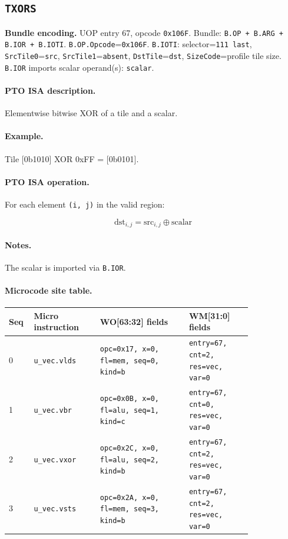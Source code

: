 \subsection{\texttt{TXORS}}
\noindent\textbf{Bundle encoding.} UOP entry 67, opcode \texttt{0x106F}. Bundle: \texttt{B.OP + B.ARG + B.IOR + B.IOTI}. \texttt{B.OP.Opcode}=\texttt{0x106F}. \texttt{B.IOTI}: selector=\texttt{111 last}, \texttt{SrcTile0}=\texttt{src}, \texttt{SrcTile1}=\texttt{absent}, \texttt{DstTile}=\texttt{dst}, \texttt{SizeCode}=profile tile size. \texttt{B.IOR} imports scalar operand(s): \texttt{scalar}.\par\smallskip
{\small
\paragraph{PTO ISA description.}
Elementwise bitwise XOR of a tile and a scalar.
\paragraph{Example.}
Tile [0b1010] XOR 0xFF = [0b0101].
\par\smallskip
\paragraph{PTO ISA operation.}
For each element \texttt{(i, j)} in the valid region:

\[
\mathrm{dst}_{i,j} = \mathrm{src}_{i,j} \oplus \mathrm{scalar}
\]
}\par\smallskip
\paragraph{Notes.}
The scalar is imported via \texttt{B.IOR}.
\paragraph{Microcode site table.}
{\scriptsize
\begin{longtable}{@{}R{0.055\linewidth}L{0.23\linewidth}L{0.31\linewidth}L{0.22\linewidth}@{}}
\toprule
Seq & Micro instruction & WO[63:32] fields & WM[31:0] fields \\
 & \texttt{u\_vec.vlds} & \texttt{opc=0x17, x=0, fl=mem, seq=0, kind=b} & \texttt{entry=67, cnt=2, res=vec, var=0} \\
1 & \texttt{u\_vec.vbr} & \texttt{opc=0x0B, x=0, fl=alu, seq=1, kind=c} & \texttt{entry=67, cnt=0, res=vec, var=0} \\
2 & \texttt{u\_vec.vxor} & \texttt{opc=0x2C, x=0, fl=alu, seq=2, kind=b} & \texttt{entry=67, cnt=2, res=vec, var=0} \\
3 & \texttt{u\_vec.vsts} & \texttt{opc=0x2A, x=0, fl=mem, seq=3, kind=b} & \texttt{entry=67, cnt=2, res=vec, var=0} \\
\bottomrule
\end{longtable}
}
